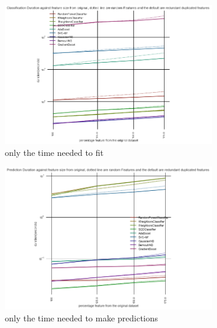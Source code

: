 \documentclass[a4paper,10pt]{article}
\begin{document}
\begin{figure}[H]
	\centering	
	\begin{subfigure}[b]{0.45\textwidth}
		\includegraphics[width=\textwidth]{images/scalability/FeatAddDupRandClass.png}
		\caption{only the time needed to fit }
		\label{fig:SADRC}
	\end{subfigure}
	\begin{subfigure}[b]{0.45\textwidth}
		\includegraphics[width=\textwidth]{images/scalability/FeatAddDupRandPred.png}
		\caption{only the time needed to make predictions}
		\label{fig:SADRP}
	\end{subfigure}
	\begin{subfigure}[b]{0.45\textwidth}

\end{subfigure}
\end{figure}
\end{document}
